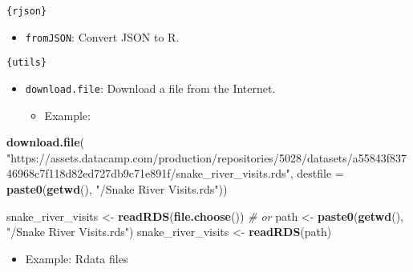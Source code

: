 \documentclass[]{book}
\newenvironment{Shaded}{\begin{snugshade}}{\end{snugshade}}
\newcommand{\CommentTok}[1]{\textcolor[rgb]{0.56,0.35,0.01}{\textit{#1}}}
\newcommand{\DataTypeTok}[1]{\textcolor[rgb]{0.13,0.29,0.53}{#1}}
\newcommand{\KeywordTok}[1]{\textcolor[rgb]{0.13,0.29,0.53}{\textbf{#1}}}
\newcommand{\NormalTok}[1]{#1}
\newcommand{\StringTok}[1]{\textcolor[rgb]{0.31,0.60,0.02}{#1}}
\providecommand{\tightlist}{%
  \setlength{\itemsep}{0pt}\setlength{\parskip}{0pt}}
\begin{document}
\texttt{\{rjson\}}

\begin{itemize}
\tightlist
\item
  \texttt{fromJSON}: Convert JSON to R.
\end{itemize}

\texttt{\{utils\}}

\begin{itemize}
\tightlist
\item
  \texttt{download.file}: Download a file from the Internet.

  \begin{itemize}
  \tightlist
  \item
    Example:
  \end{itemize}
\end{itemize}

\begin{Shaded}
\begin{Highlighting}[]
\KeywordTok{download.file}\NormalTok{(}
  \StringTok{"https://assets.datacamp.com/production/repositories/5028/datasets/a55843f83746968c7f118d82ed727db9c71e891f/snake_river_visits.rds"}\NormalTok{,}
  \DataTypeTok{destfile =} \KeywordTok{paste0}\NormalTok{(}\KeywordTok{getwd}\NormalTok{(), }\StringTok{"/Snake River Visits.rds"}\NormalTok{))}

\NormalTok{snake_river_visits <-}\StringTok{ }\KeywordTok{readRDS}\NormalTok{(}\KeywordTok{file.choose}\NormalTok{())}
\CommentTok{# or}
\NormalTok{path <-}\StringTok{ }\KeywordTok{paste0}\NormalTok{(}\KeywordTok{getwd}\NormalTok{(), }\StringTok{"/Snake River Visits.rds"}\NormalTok{)}
\NormalTok{snake_river_visits <-}\StringTok{ }\KeywordTok{readRDS}\NormalTok{(path)}
\end{Highlighting}
\end{Shaded}

\begin{itemize}
\tightlist
\item
  Example: Rdata files
\end{itemize}
\end{document}
